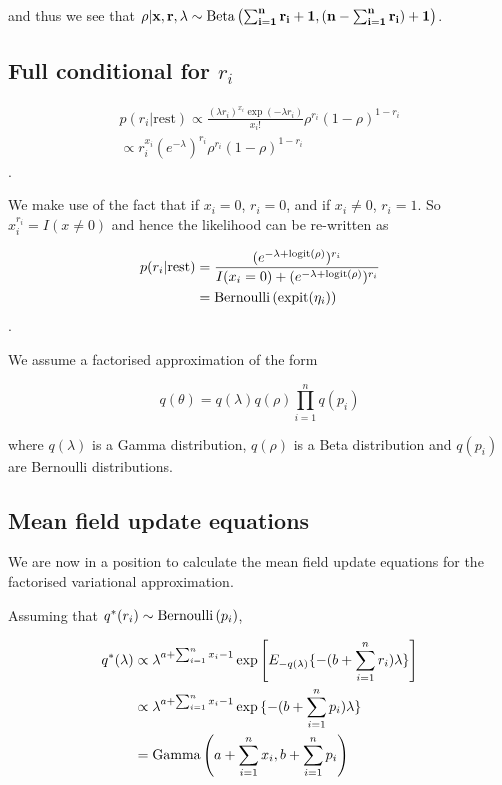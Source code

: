 \documentclass{amsart}
\begin{document}
and thus we see that $\rho | \bf x, \bf r, \lambda \sim \text{Beta} \left( \sum_{i=1}^n r_i + 1, (n - \sum_{i=1}^n r_i) + 1 \right)$.

\subsection{Full conditional for $r_i$}
\begin{align*}
p(r_i | \text{rest}) \propto \frac{(\lambda r_i)^{x_i} \exp{(-\lambda r_i)}}{x_i !} \rho^{r_i} (1 - \rho)^{1 - r_i} \\
\propto r_i^{x_i} (e^{-\lambda})^{r_i} \rho^{r_i} (1 - \rho)^{1 - r_i}
\end{align*}.

We make use of the fact that if $x_i = 0$, $r_i = 0$, and if $x_i \ne 0$,
$r_i = 1$. So $x_i^{r_i} = I(x \ne 0)$ and hence the likelihood can be re-written as

\begin{align*}
p(r_i | \text{rest}) &= \frac{(e^{-\lambda + \text{logit} \left( \rho \right)})^{r_i}}{I(x_i = 0) + (e^{-\lambda + \text{logit} \left( \rho \right)})^{r_i}} \\
&= \text{Bernoulli} \left( \text{expit}(\eta_i) \right)
\end{align*}.


We assume a factorised approximation of the form

$$
q(\theta) = q(\lambda) q(\rho) \prod_{i=1}^n q(p_i)
$$

where $q(\lambda)$ is a Gamma distribution, $q(\rho)$ is a Beta distribution and
$q(p_i)$ are Bernoulli distributions.


\subsection{Mean field update equations}
We are now in a position to calculate the mean field update equations for the factorised
variational approximation.

Assuming that $q^*(r_i) \sim \text{Bernoulli} \left( p_i \right)$,

\begin{align*}
q^*(\lambda) &\propto \lambda^{a+\sum_{i=1}^n x_i - 1} \exp{\left[ E_{-q(\lambda)} \{-(b + \sum_{i=1}^n r_i) \lambda \} \right]} \\
&\propto \lambda^{a+\sum_{i=1}^n x_i - 1} \exp{\{-(b + \sum_{i=1}^n p_i)\lambda \} } \\
&= \text{Gamma} \left( a+\sum_{i=1}^n x_i, b + \sum_{i=1}^n p_i \right)
\end{align*}
\end{document}
